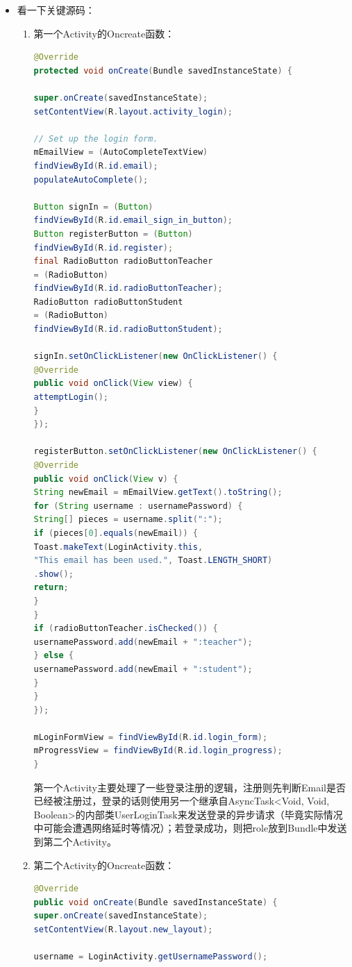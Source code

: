 \begin{itemize}
\begin{enumerate}
\begin{itemize}
		\item 看一下关键源码：
		\begin{enumerate}
			\item 第一个Activity的Oncreate函数：
					\begin{lstlisting}[language=Java]
@Override
protected void onCreate(Bundle savedInstanceState) {

super.onCreate(savedInstanceState);
setContentView(R.layout.activity_login);

// Set up the login form.
mEmailView = (AutoCompleteTextView)
findViewById(R.id.email);
populateAutoComplete();

Button signIn = (Button) 
findViewById(R.id.email_sign_in_button);
Button registerButton = (Button) 
findViewById(R.id.register);
final RadioButton radioButtonTeacher 
= (RadioButton) 
findViewById(R.id.radioButtonTeacher);
RadioButton radioButtonStudent 
= (RadioButton) 
findViewById(R.id.radioButtonStudent);

signIn.setOnClickListener(new OnClickListener() {
@Override
public void onClick(View view) {
attemptLogin();
}
});

registerButton.setOnClickListener(new OnClickListener() {
@Override
public void onClick(View v) {
String newEmail = mEmailView.getText().toString();
for (String username : usernamePassword) {
String[] pieces = username.split(":");
if (pieces[0].equals(newEmail)) {
Toast.makeText(LoginActivity.this, 
"This email has been used.", Toast.LENGTH_SHORT)
.show();
return;
}
}
if (radioButtonTeacher.isChecked()) {
usernamePassword.add(newEmail + ":teacher");
} else {
usernamePassword.add(newEmail + ":student");
}
}
});

mLoginFormView = findViewById(R.id.login_form);
mProgressView = findViewById(R.id.login_progress);
}
			\end{lstlisting}
			第一个Activity主要处理了一些登录注册的逻辑，注册则先判断Email是否已经被注册过，登录的话则使用另一个继承自AsyncTask<Void, Void, Boolean>的内部类UserLoginTask来发送登录的异步请求（毕竟实际情况中可能会遭遇网络延时等情况）；若登录成功，则把role放到Bundle中发送到第二个Activity。
			
			\item 第二个Activity的Oncreate函数：
			\begin{lstlisting}[language=Java]
@Override
public void onCreate(Bundle savedInstanceState) {
super.onCreate(savedInstanceState);
setContentView(R.layout.new_layout);

username = LoginActivity.getUsernamePassword();


\end{lstlisting}
\end{enumerate}
\end{itemize}
\end{enumerate}
\end{itemize}
